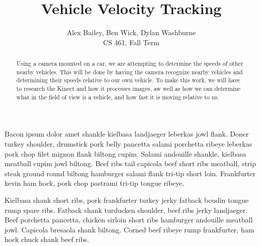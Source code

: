 \documentclass[letterpaper,10pt,onecolumn,draftclsnofoot]{IEEEtran}
\title{Vehicle Velocity Tracking}
\author{Alex Bailey, Ben Wick, Dylan Washburne\\CS 461, Fall Term}
\begin{document}
\begin{titlepage}

\maketitle

\begin{abstract}
Using a camera mounted on a car, we are attempting to determine the speeds of other nearby vehicles.  This will be done by having the camera recognize nearby vehicles and determining their speeds relative to our own vehicle. To make this work, we will have to research the Kinect and how it processes images, aw well as how we can determine what in the field of view is a vehicle, and how fast it is moving relative to us.
\end{abstract}

\end{titlepage}

Bacon ipsum dolor amet shankle kielbasa landjaeger leberkas jowl flank. Doner turkey shoulder, drumstick pork belly pancetta salami porchetta ribeye leberkas pork chop filet mignon flank biltong cupim. Salami andouille shankle, kielbasa meatball cupim jowl biltong. Beef ribs tail capicola beef short ribs meatball, strip steak ground round biltong hamburger salami flank tri-tip short loin. Frankfurter kevin ham hock, pork chop pastrami tri-tip tongue ribeye.

Kielbasa shank short ribs, pork frankfurter turkey jerky fatback boudin tongue rump spare ribs. Fatback shank turducken shoulder, beef ribs jerky landjaeger. Beef porchetta pancetta, chicken sirloin short ribs hamburger andouille meatball jowl. Capicola bresaola shank biltong. Corned beef ribeye rump frankfurter, ham hock chuck shank beef ribs.
\end{document}
